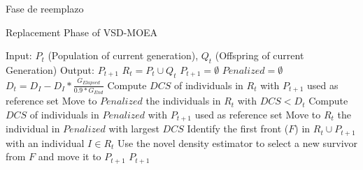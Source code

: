 \documentclass{beamer}
\begin{document}
\begin{frame}{Fase de reemplazo}
  \begin{algorithm}[H]
  \begin{scriptsize}
	\caption{Replacement Phase of VSD-MOEA} 
\begin{algorithmic}[1]
\STATE Input: $P_t$ (Population of current generation), $Q_t$ (Offspring of current Generation)
    	\STATE Output: $P_{t+1}$ 
        \STATE $R_t = P_t \cup Q_t$ \label{alg:1}
        \STATE $P_{t+1} = \emptyset$ \label{alg:2}
        \STATE $Penalized = \emptyset$ \label{alg:3}
				\STATE $D_t = D_I - D_I * \frac{G_{Elapsed}}{0.9*G_{End}}$ \label{alg:4}
         \label{alg:6}
					\STATE Compute $DCS$ of individuals in $R_t$ with $P_{t+1}$ used as reference set \label{alg:7}
					\STATE Move to $Penalized$ the individuals in $R_t$ with $DCS < D_t$  \label{alg:8}
        	 \label{alg:9}
						\STATE Compute $DCS$ of individuals in $Penalized$ with $P_{t+1}$ used as reference set \label{alg:10}
						\STATE Move to $R_t$ the individual in $Penalized$ with largest $DCS$ \label{alg:11}
        	\ENDIF
					\STATE Identify the first front ($F$) in $R_t \cup P_{t+1}$ with an individual $I \in R_t$ \label{alg:12}
					\STATE Use the novel density estimator  to select a new survivor 
					from $F$ and move it to $P_{t+1}$\label{alg:13}
        \ENDWHILE
    	\RETURN $P_{t+1}$ \label{alg:14}
	\end{algorithmic}

\label{alg:Replacement_Phase}
\end{scriptsize}
\end{algorithm}
\end{frame}
\end{document}
